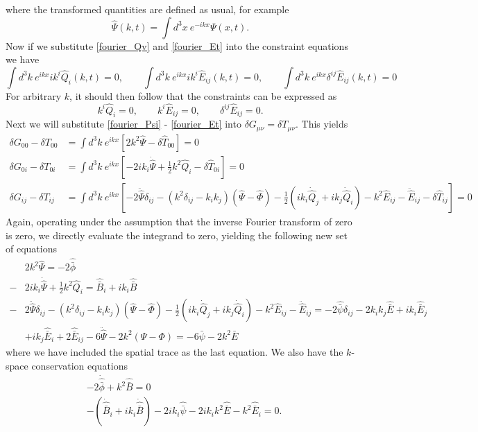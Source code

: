 \documentclass[10pt,letterpaper]{article}
\newcommand{\plr}[1]{\left(#1\right)} %
\newcommand{\blr}[1]{\left[#1\right]} %
\newcommand{\be}{\begin{equation}} %
\newcommand{\ee}{\end{equation}} %
\numberwithin{equation}{section}
\begin{document}
where the transformed quantities are defined as usual, for example
\be
	\hat \Psi(k,t) = \int d^3x\ e^{-ikx} \Psi(x,t).
\ee
Now if we substitute \ref{fourier_Qv} and \ref{fourier_Et} into the constraint equations we have
\be
	\int d^3k\  e^{ikx} ik^i \hat Q_i(k,t) = 0, \qquad \int d^3k\  e^{ikx} ik^i \hat E_{ij}(k,t) = 0,\qquad \int d^3k\  e^{ikx} \delta^{ij} \hat E_{ij}(k,t) = 0
\ee
For arbitrary $k$, it should then follow that the constraints can be expressed as
\be
	k^i \hat Q_i = 0,\qquad k^i \hat E_{ij} = 0,\qquad \delta^{ij}\hat E_{ij} =0\label{fourier_constraints}.
\ee
Next we will substitute \ref{fourier_Psi} - \ref{fourier_Et} into $\delta G_{\mu\nu} = \delta T_{\mu\nu}$. This yields
\begin{align}
	\delta G_{00}-\delta T_{00} &= \int d^3k\ e^{ikx} \blr{ 2 k^2 \hat\Psi - \delta \hat T_{00}} = 0\\
	\delta G_{0i}-\delta T_{0i} &= \int d^3k\ e^{ikx} \blr{ -2 ik_i \dot{\hat  \Psi} +\frac12 k^2 \hat Q_i- \delta \hat T_{0i}} = 0\\
	\delta G_{ij}-\delta T_{ij} &= \int d^3k\ e^{ikx} \blr{ -2 \ddot{\hat \Psi} \delta_{ij} - (k^2 \delta_{ij} - k_ik_j)(\hat \Psi - \hat \Phi)
	-\frac12\plr{ ik_i \dot{\hat Q}_j + ik_j \dot{\hat {Q}}_i} - k^2 \hat E_{ij} - \ddot {\hat{E}}_{ij}-\delta \hat T_{ij}}=0
\end{align}
Again, operating under the assumption that the inverse Fourier transform of zero is zero, we directly evaluate the integrand to zero, yielding the following new set of equations
\begin{align}
	&2k^2 \hat \Psi = -2\hat{\bar \phi}\label{fourier_1} \\
	 -&2 ik_i \dot{\hat  \Psi} +\frac12 k^2 \hat Q_i= \hat{\bar B}_i+ik_i \hat{\bar B}\label{fourier_2}\\
	  -&2 \ddot{\hat \Psi} \delta_{ij} - (k^2 \delta_{ij} - k_ik_j)(\hat \Psi - \hat \Phi)
	-\frac12\plr{ ik_i \dot{\hat Q}_j + ik_j \dot{\hat {Q}}_i} - k^2 \hat E_{ij} - \ddot {\hat{E}}_{ij}=-2\hat{\bar \psi}\delta_{ij} - 2k_ik_j \hat{\bar E} + ik_i \hat{\bar E}_j\\
& + ik_j \hat{\bar E}_i + 2\hat{\bar E}_{ij}-6\ddot{\hat \Psi} - 2k^2(\Psi-\Phi) = -6\bar\psi - 2k^2\bar E \nonumber
\end{align}
where we have included the spatial trace as the last equation. We also have the $k$-space conservation equations
\begin{align}
	&-2\dot{\hat{\bar{\phi}}} + k^2 \hat{\bar B} = 0\\
&-(\dot{\hat{\bar{B}}}_i + ik_i \dot{\hat{\bar B}}) - 2ik_i \hat{\bar\psi} - 2ik_ik^2\hat{\bar E} - k^2 \hat{\bar{E}}_i = 0.
\end{align}
\end{document}
